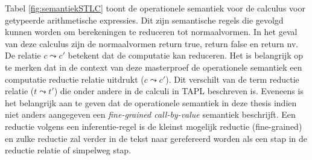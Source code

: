 Tabel \ref{fig:semantiekSTLC} toont de operationele semantiek voor de calculus voor getypeerde arithmetische expressies. Dit zijn semantische regels die gevolgd kunnen worden om berekeningen te reduceren tot normaalvormen. In het geval van deze calculus zijn de normaalvormen return true, return false en return nv. De relatie $c \leadsto c'$ betekent dat de computatie kan reduceren. Het is belangrijk op te merken dat in de context van deze masterproef de operationele semantiek een computatie reductie relatie uitdrukt ($c \leadsto c'$). Dit verschilt van de term reductie relatie ($t \leadsto t'$) die onder andere in de calculi in TAPL beschreven is. Eveneens is het belangrijk aan te geven dat de operationele semantiek in deze thesis indien niet anders aangegeven een \emph{fine-grained call-by-value} semantiek beschrijft. Een reductie volgens een inferentie-regel is de kleinst mogelijk reductie (fine-grained) en zulke reductie zal verder in de tekst naar gerefereerd worden als een stap in de reductie relatie of simpelweg stap.

